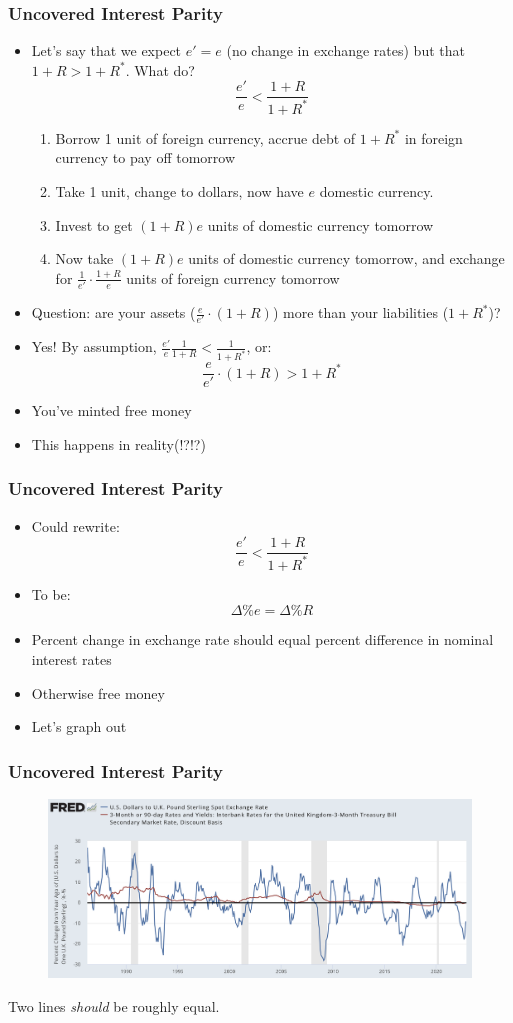 \documentclass{beamer}
\begin{document}
\begin{frame}
\frametitle[alignment=center]{Uncovered Interest Parity}
\begin{itemize}
\item Let's say that we expect $e'=e$ (no change in exchange rates) but that $1+R>1+R^*$.  What do?
$$\frac{e'}{e}<\frac{1+R}{1+R^*}$$
\begin{enumerate}
\item Borrow 1 unit of foreign currency, accrue debt of $1+R^*$ in foreign currency to pay off tomorrow
\item Take 1 unit, change to dollars, now have $e$ domestic currency. 
\item  Invest to get $(1+R)e$ units of domestic currency tomorrow
\item Now take $(1+R)e$ units of domestic currency tomorrow, and exchange for $\frac{1}{e'}\cdot\frac{1+R}{e}$ units of foreign currency tomorrow
\end{enumerate}
\item Question: are your assets ($\frac{e}{e'}\cdot(1+R)$) more than your liabilities ($1+R^*$)?
\item Yes!  By assumption, $\frac{e'}{e}\frac{1}{1+R}<\frac{1}{1+R^*}$, or:
$$\frac{e}{e'}\cdot(1+R)>1+R^*$$
\item You've minted free money
\item This happens in reality(!?!?)
\end{itemize}
\end{frame}

\begin{frame}
\frametitle[alignment=center]{Uncovered Interest Parity}
\begin{itemize}
\item Could rewrite:
$$\frac{e'}{e}<\frac{1+R}{1+R^*}$$
\item To be:
$$\Delta\% e=\Delta\% R$$
\item Percent change in exchange rate should equal percent difference in nominal interest rates
\bigskip
\item Otherwise free money
\bigskip
\item Let's graph out
\end{itemize}
\end{frame}

\begin{frame}
\frametitle[alignment=center]{Uncovered Interest Parity}
\begin{figure}
\includegraphics[scale=0.3]{Figures/UncoveredInterestParity.png}
\end{figure}
Two lines \emph{should} be roughly equal.
\end{frame}
\end{document}
